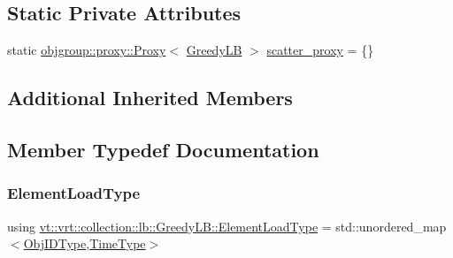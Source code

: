 \subsection*{Static Private Attributes}
\begin{DoxyCompactItemize}
\item 
static \hyperlink{structvt_1_1objgroup_1_1proxy_1_1_proxy}{objgroup\+::proxy\+::\+Proxy}$<$ \hyperlink{structvt_1_1vrt_1_1collection_1_1lb_1_1_greedy_l_b}{Greedy\+LB} $>$ \hyperlink{structvt_1_1vrt_1_1collection_1_1lb_1_1_greedy_l_b_a6be0a6b993320f141d5f94867511abfb}{scatter\+\_\+proxy} = \{\}
\end{DoxyCompactItemize}
\subsection*{Additional Inherited Members}


\subsection{Member Typedef Documentation}
\mbox{\label{structvt_1_1vrt_1_1collection_1_1lb_1_1_greedy_l_b_af08e010a34268f2a299ce37dc428ea75}} 
\subsubsection{\texorpdfstring{Element\+Load\+Type}{ElementLoadType}}
{\footnotesize\ttfamily using \hyperlink{structvt_1_1vrt_1_1collection_1_1lb_1_1_greedy_l_b_af08e010a34268f2a299ce37dc428ea75}{vt\+::vrt\+::collection\+::lb\+::\+Greedy\+L\+B\+::\+Element\+Load\+Type} =  std\+::unordered\+\_\+map$<$\hyperlink{structvt_1_1vrt_1_1collection_1_1lb_1_1_base_l_b_a15a2f756b59c8c2437985206b32aa403}{Obj\+I\+D\+Type},\hyperlink{namespacevt_a876a9d0cd5a952859c72de8a46881442}{Time\+Type}$>$}

\mbox{\label{structvt_1_1vrt_1_1collection_1_1lb_1_1_greedy_l_b_a3db2c9b36ac99ed4aed38519be4aad60}} 
